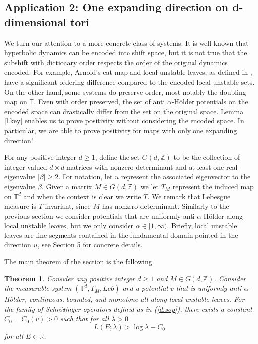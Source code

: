 \documentclass{amsart}
\newtheorem{theorem}{Theorem}
\newcommand{\RR}{\mathbb{R}}
\newcommand{\TT}{\mathbb{T}}
\newcommand{\ZZ}{\mathbb{Z}}
\begin{document}
\subsection{Application 2: One expanding direction on d-dimensional tori} \hypertarget{Application2}{}

We turn our attention to a more concrete class of systems. It is well known that hyperbolic dynamics can be encoded into shift space, but it is not true that the subshift with dictionary order respects the order of the original dynamics encoded. For example, Arnold's cat map and local unstable leaves, as defined in \cite{chiem}, have a significant ordering difference compared to the encoded local unstable sets. On the other hand, some systems do preserve order, most notably the doubling map on $\TT$. Even with order preserved, the set of anti $\alpha$-H\"older potentials on the encoded space can drastically differ from the set on the original space. Lemma \ref{l.key} enables us to prove positivity without considering the encoded space. In particular, we are able to prove positivity for maps with only one expanding direction! 

For any positive integer $d\geq 1$, define the set $G(d,\ZZ)$ to be the collection of integer valued $d\times d$ matrices with nonzero determinant and at least one real-eigenvalue $|\beta|\geq 2$. For notation, let $u$ represent the associated eigenvector to the eigenvalue $\beta$. Given a matrix $M\in G(d,\ZZ)$ we let $T_M$ represent the induced map on $\TT^d$ and when the context is clear we write $T$. We remark that Lebesgue measure is $T$-invariant, since $M$ has nonzero determinant. Similarly to the previous section we consider potentials that are uniformly anti $\alpha$-H\"older along local unstable leaves, but we only consider $\alpha\in [1,\infty)$. Briefly, local unstable leaves are line segments contained in the fundamental domain pointed in the direction $u$, see Section \hyperlink{OEDT}{5} for concrete details.

The main theorem of the section is the following.

\begin{theorem}\label{t.PLEhd}
    Consider any positive integer $d\geq 1$ and $M\in G(d,\ZZ)$. Consider the measurable system $(\TT^d, T_M, Leb)$ and a potential $v$ that is uniformly anti $\alpha$-H\"older, continuous, bounded, and monotone all along local unstable leaves. For the family of Schr\"odinger operators defined as in (\ref{d.sop}), there exists a constant $C_0 = C_0(v)>0$ such that for all $\lambda > 0$
    \[L(E; \lambda) > \log\lambda - C_0\]
    for all $E\in \RR$.
\end{theorem}
\end{document}
